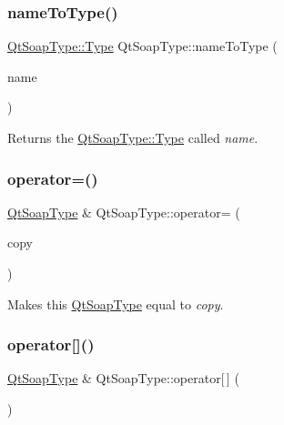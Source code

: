 \subsubsection{\texorpdfstring{name\+To\+Type()}{nameToType()}}
{\footnotesize\ttfamily \mbox{\hyperlink{class_qt_soap_type_a840b69f1d92eeb4e64ae1e0439d54683}{Qt\+Soap\+Type\+::\+Type}} Qt\+Soap\+Type\+::name\+To\+Type (\begin{DoxyParamCaption}\item[{const Q\+String \&}]{name }\end{DoxyParamCaption})\hspace{0.3cm}{\ttfamily [static]}}

Returns the \mbox{\hyperlink{class_qt_soap_type_a840b69f1d92eeb4e64ae1e0439d54683}{Qt\+Soap\+Type\+::\+Type}} called {\itshape name}. \mbox{\label{class_qt_soap_type_a8b7eb83f5d0ff312db12e7c780bd2a28}} 
\subsubsection{\texorpdfstring{operator=()}{operator=()}}
{\footnotesize\ttfamily \mbox{\hyperlink{class_qt_soap_type}{Qt\+Soap\+Type}} \& Qt\+Soap\+Type\+::operator= (\begin{DoxyParamCaption}\item[{const \mbox{\hyperlink{class_qt_soap_type}{Qt\+Soap\+Type}} \&}]{copy }\end{DoxyParamCaption})}

Makes this \mbox{\hyperlink{class_qt_soap_type}{Qt\+Soap\+Type}} equal to {\itshape copy}. \mbox{\label{class_qt_soap_type_a3b8735f02d9628294bb3f2c6f4fbae20}} 
\subsubsection{\texorpdfstring{operator[]()}{operator[]()}\hspace{0.1cm}{\footnotesize\ttfamily [1/6]}}
{\footnotesize\ttfamily \mbox{\hyperlink{class_qt_soap_type}{Qt\+Soap\+Type}} \& Qt\+Soap\+Type\+::operator\mbox{[}$\,$\mbox{]} (\begin{DoxyParamCaption}\item[{int}]{ }\end{DoxyParamCaption})\hspace{0.3cm}{\ttfamily [virtual]}}

